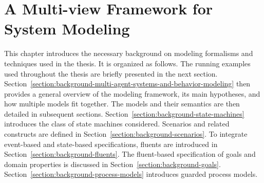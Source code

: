 \chapter{A Multi-view Framework for System Modeling\label{chapter:framework}}

This chapter introduces the necessary background on modeling formalisms and techniques used in the thesis. It is organized as follows. The running examples used throughout the thesis are briefly presented in the next section. Section~\ref{section:background-multi-agent-systems-and-behavior-modeling} then provides a general overview of the modeling framework, its main hypotheses, and how multiple models fit together. The models and their semantics are then detailed in subsequent sections. Section~\ref{section:background-state-machines} introduces the class of state machines considered. Scenarios and related constructs are defined in Section~\ref{section:background-scenarios}. To integrate event-based and state-based specifications, fluents are introduced in Section~\ref{section:background-fluents}. The fluent-based specification of goals and domain properties is discussed in Section~\ref{section:background-goals}. Section~\ref{section:background-process-models} introduces guarded process models.









